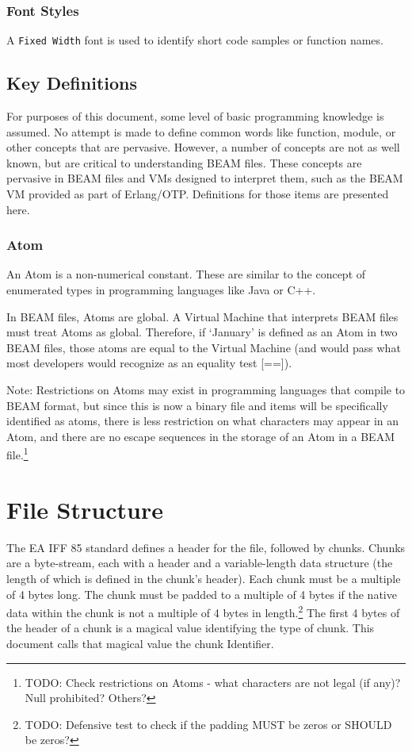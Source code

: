 \documentclass{article}
\begin{document}
\subsubsection{Font Styles}
A \texttt{Fixed Width} font is used to identify short code samples or function names.



\subsection{Key Definitions}
For purposes of this document, some level of basic programming knowledge is
assumed.  No attempt is made to define common words like function, module,
or other concepts that are pervasive.  However, a number of concepts
are not as well known, but are critical to understanding BEAM files. 
These concepts are pervasive in BEAM files and VMs designed to interpret
them, such as the BEAM VM provided as part of Erlang/OTP.  Definitions
for those items are presented here.

\subsubsection{Atom}
An Atom is a non-numerical constant.  These are similar to the concept of 
enumerated types in programming languages like Java or C++.  

In BEAM files, Atoms are global.  A Virtual Machine that interprets BEAM files 
must treat Atoms as global.  Therefore, if `January' is defined as an Atom in
two BEAM files, those atoms are equal to the Virtual Machine (and would pass 
what most developers would recognize as an equality test [==]).

Note: Restrictions on Atoms may exist in programming languages that compile to
BEAM format, but since this is now a binary file and items will be specifically
identified as atoms, there is less restriction on what characters may
appear in an Atom, and there are no escape sequences in the storage of an
Atom in a BEAM file.\footnote{TODO: Check restrictions on Atoms - what characters
are not legal (if any)? Null prohibited? Others?}

\section{File Structure}
The EA IFF 85 standard defines a header for the file, followed 
by chunks.  Chunks are a byte-stream, each with a header and a
variable-length data structure (the length of which is defined in 
the chunk's header).  Each chunk must be a multiple of 4 bytes long.
The chunk must be padded to a multiple of 4 bytes if the native data
within the chunk is not a multiple of 4 bytes in length.\footnote{TODO:
Defensive test to check if the padding MUST be zeros or SHOULD be zeros?}
The first 4 bytes of the header of a chunk is a
magical value identifying the type of chunk.  This document calls that
magical value the chunk Identifier.
\end{document}
